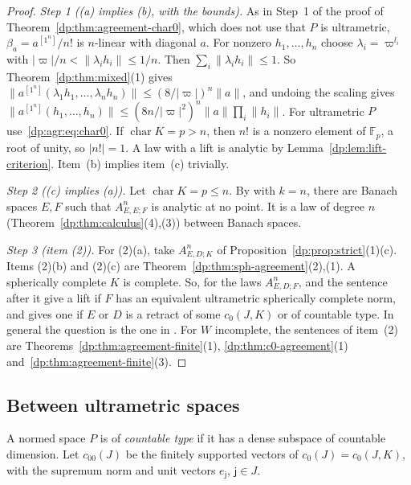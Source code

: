 \documentclass[11pt]{amsart}
\theoremstyle{definition}
\theoremstyle{remark}
\numberwithin{equation}{section}
\newcommand{\F}{\mathbb F}
\newcommand{\abs}[1]{\lvert #1\rvert}
\newcommand{\norm}[1]{\lVert #1\rVert}
\theoremstyle{plain}
\theoremstyle{definition}
\theoremstyle{plain}
\begin{document}
\begin{proof}
\emph{Step 1 ((a) implies (b), with the bounds).} As in Step~1 of the proof of Theorem~\ref{dp:thm:agreement-char0}, which does not use that $P$ is ultrametric, $\beta_a=a^{[1^n]}/n!$ is $n$\nobreakdash-linear with diagonal $a$. For nonzero $h_1,\dots,h_n$ choose $\lambda_i=\varpi^{l_i}$ with $\abs\varpi/n<\norm{\lambda_ih_i}\le1/n$. Then $\sum_i\norm{\lambda_ih_i}\le1$. So Theorem~\ref{dp:thm:mixed}(1) gives $\norm{a^{[1^n]}(\lambda_1h_1,\dots,\lambda_nh_n)}\le(8/\abs\varpi)^n\norm a$, and undoing the scaling gives $\norm{a^{[1^n]}(h_1,\dots,h_n)}\le(8n/\abs\varpi^2)^n\norm a\prod_i\norm{h_i}$. For ultrametric $P$ use~\eqref{dp:agr:eq:char0}. If $\operatorname{char}K=p>n$, then $n!$ is a nonzero element of $\F_p$, a root of unity, so $\abs{n!}=1$. A law with a lift is analytic by Lemma~\ref{dp:lem:lift-criterion}. Item~(b) implies item~(c) trivially.

\emph{Step 2 ((c) implies (a)).} Let $\operatorname{char}K=p\le n$. By \cite[Theorem~7.2(1)]{I} with $k=n$, there are Banach spaces $E,F$ such that $A^n_{E,E;F}$ is analytic at no point. It is a law of degree $n$ (Theorem~\ref{dp:thm:calculus}(4),(3)) between Banach spaces.

\emph{Step 3 (item (2)).} For (2)(a), take $A^n_{E,D;K}$ of Proposition~\ref{dp:prop:strict}(1)(c). Items (2)(b) and (2)(c) are Theorem~\ref{dp:thm:sph-agreement}(2),(1). A spherically complete $K$ is complete. So, for the laws $A^n_{E,D;F}$, \cite[Theorem~5.2]{I} and the sentence after it give a lift if $F$ has an equivalent ultrametric spherically complete norm, and \cite[Theorem~5.4]{I} gives one if $E$ or $D$ is a retract of some $c_0(J,K)$ or of countable type. In general the question is the one in \cite[Section~12]{I}. For $W$ incomplete, the sentences of item~(2) are Theorems~\ref{dp:thm:agreement-finite}(1), \ref{dp:thm:c0-agreement}(1) and~\ref{dp:thm:agreement-finite}(3).
\end{proof}

\subsection{Between ultrametric spaces}\label{dp:ssec:agree-ultrametric}

A normed space $P$ is of \emph{countable type} if it has a dense subspace of countable dimension. Let $c_{00}(J)$ be the finitely supported vectors of $c_0(J)=c_0(J,K)$, with the supremum norm and unit vectors $e_{\mathsf j}$, $\mathsf j\in J$.
\end{document}
